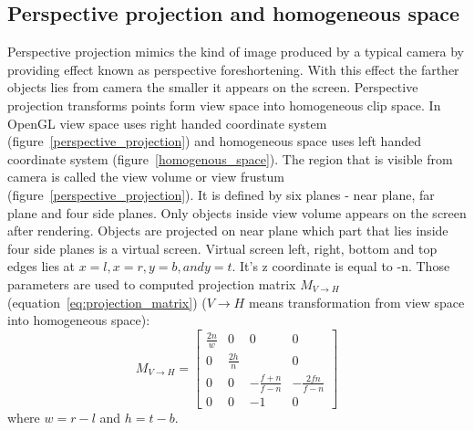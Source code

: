 \subsection{Perspective projection and homogeneous space}
Perspective projection mimics the kind of image produced by a typical camera by providing effect known as perspective foreshortening. With this effect the farther objects lies from camera the smaller it appears on the screen. 
Perspective projection transforms points form view space into homogeneous clip space. In OpenGL view space uses right handed coordinate system (figure~\ref{perspective_projection}) and homogeneous space uses left handed coordinate system (figure~\ref{homogenous_space}). 
The region that is visible from camera is called the view volume or view frustum (figure~\ref{perspective_projection}). It is defined by six  planes - near plane, far plane and four side planes. Only objects inside view volume appears on the screen after rendering. Objects are projected on near plane which part that lies inside four side planes is a virtual screen.
Virtual screen left, right, bottom and top edges lies at $x=l, x=r, y=b, and y=t$. It's z coordinate is equal to -n. Those parameters are used to computed projection matrix $M_{V \to H }$ (equation~\ref{eq:projection_matrix}) ($V \to H$ means transformation from view space into homogeneous space):
\begin{equation}
\label{eq:projection_matrix}
M_{V \to H } = 
\begin{bmatrix}
\frac{2n}{w} & 0            & 0                & 0                \\ 
0            & \frac{2h}{n} &                  & 0                 \\ 
0            & 0            & -\frac{f+n}{f-n} & -\frac{2fn}{f-n} \\ 
0            & 0            & -1               & 0
\end{bmatrix}
\end{equation}
where $w=r-l$ and $h=t-b$.





